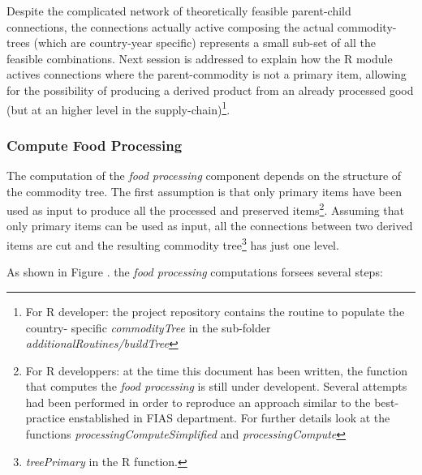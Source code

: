 \documentclass[nojss]{jss}
\begin{document}
Despite the complicated network of theoretically feasible parent-child connections, the connections actually active composing the actual commodity-trees (which are country-year specific) represents a small sub-set of all the feasible combinations. Next session is addressed to explain how the R module actives connections where the parent-commodity is not a primary item, allowing for the possibility of producing a derived product from an already processed good (but at an higher level in the supply-chain)\footnote{For R developer: the project repository contains the routine to populate the country- specific \textit{commodityTree} in the sub-folder \textit{additionalRoutines/buildTree}}. 


\subsubsection{Compute Food Processing}

The computation of the \textit{food processing} component depends on the structure of the commodity tree. The first assumption is that only primary items have been used as input to produce all the processed and preserved items\footnote{For R developpers: at the time this document has been written, the function that computes the \textit{food processing } is still under developent. Several attempts had been performed in order to reproduce an approach similar to the best-practice enstablished in FIAS department. For further details look at the functions \textit{processingComputeSimplified} and \textit{processingCompute}}. 
Assuming that only primary items can be used as input, all the connections between two derived items are cut and the resulting commodity tree\footnote{\textit{treePrimary} in the R function.} has just one level. 

As shown in Figure . the \textit{food processing} computations forsees several steps:
\end{document}
